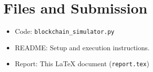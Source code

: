 \documentclass[11pt]{article}
\begin{document}
\section*{Files and Submission}
\begin{itemize}
  \item Code: \texttt{blockchain\_simulator.py}
  \item README: Setup and execution instructions.
  \item Report: This LaTeX document (\texttt{report.tex})
\end{itemize}
\end{document}
